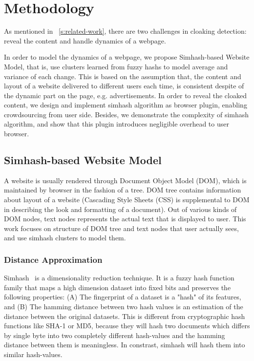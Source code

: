 \section{Methodology}
\label{s:methodology}
As mentioned in ~\autoref{s:related-work}, there are two challenges in cloaking
detection: reveal the content and handle dynamics of a webpage.

In order to model the dynamics of a webpage, we propose Simhash-based Website
Model, that is, use clusters learned from fuzzy hashs to model average and
variance of each change. This is based on the assumption that, the content and
layout of a website delivered to different users each time, is consistent
despite of the dynamic part on the page, e.g. advertisements. In order to reveal
the cloaked content, we design and implement simhash algorithm as browser
plugin, enabling crowdsourcing from user side.
Besides, we demonstrate the complexity of simhash algorithm, and show
that this plugin introduces negligible overhead to user browser.

\subsection{Simhash-based Website Model}
\label{ss:swm}
A website is usually rendered through Document
Object Model (DOM), which is maintained by browser in the fashion of a tree.
DOM tree contains information about layout of a website (Cascading Style
Sheets (CSS) is supplemental to DOM in describing the look and
formatting of a document). Out of various kinds of DOM nodes,  text nodes
represents the actual text that is displayed to user. This work focuses on
structure of DOM tree and text nodes that user actually sees, and use simhash
clusters to model them.


\subsubsection{Distance Approximation}
Simhash~\cite{charikar2002similarity} is a dimensionality reduction technique.
It is a fuzzy hash function family that maps a high dimension dataset into fixed
bits and preserves the following properties: 
(A) The fingerprint of a dataset is a "hash" of its features, and (B) The
hamming distance between two hash values is an estimation of the distance
between the original datasets.
This is different from 
cryptographic hash functions like SHA-1 or MD5, because they will hash two
documents which differs by single byte into two completely different hash-values and the
hamming distance between them is meaningless. 
In constrast, simhash will hash them into similar hash-values.

